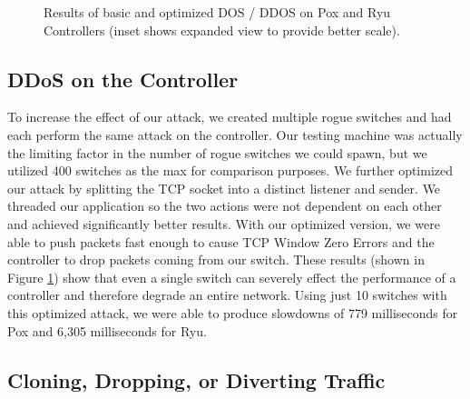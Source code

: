 \begin{figure}[ht]
	{\setlength{\fboxsep}{0pt}%
	\setlength{\fboxrule}{1pt}%
	}%
  \caption{Results of basic and optimized DOS / DDOS on Pox and Ryu Controllers (inset shows expanded view to provide better scale).}
  \label{fig:DOSattacks}
\end{figure}

\subsection{DDoS on the Controller}
   To increase the effect of our attack, we created multiple rogue switches and had each perform the same attack on the controller. Our testing machine was actually the limiting factor in the number of rogue switches we could spawn, but we utilized 400 switches as the max for comparison purposes.  We further optimized our attack by splitting the TCP socket into a distinct listener and sender. We threaded our application so the two actions were not dependent on each other and achieved significantly better results. With our optimized version, we were able to push packets fast enough to cause TCP Window Zero Errors and the controller to drop packets coming from our switch.  These results (shown in Figure \ref{fig:DOSattacks}) show that even a single switch can severely effect the performance of a controller and therefore degrade an entire network. Using just 10 switches with this optimized attack, we were able to produce slowdowns of 779 milliseconds for Pox and 6,305 milliseconds for Ryu.

\subsection{Cloning, Dropping, or Diverting Traffic}

